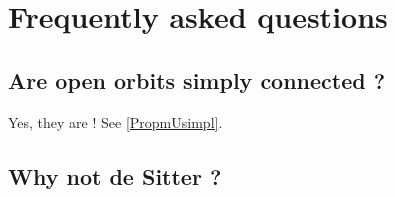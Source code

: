 %
   \section{Frequently asked questions}
%

\subsection{Are open orbits simply connected ?}

Yes, they are ! See \ref{PropmUsimpl}.

\subsection{Why not de Sitter ?}

